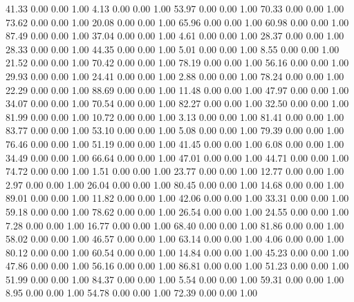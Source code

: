    41.33   0.00   0.00   1.00
    4.13   0.00   0.00   1.00
   53.97   0.00   0.00   1.00
   70.33   0.00   0.00   1.00
   73.62   0.00   0.00   1.00
   20.08   0.00   0.00   1.00
   65.96   0.00   0.00   1.00
   60.98   0.00   0.00   1.00
   87.49   0.00   0.00   1.00
   37.04   0.00   0.00   1.00
    4.61   0.00   0.00   1.00
   28.37   0.00   0.00   1.00
   28.33   0.00   0.00   1.00
   44.35   0.00   0.00   1.00
    5.01   0.00   0.00   1.00
    8.55   0.00   0.00   1.00
   21.52   0.00   0.00   1.00
   70.42   0.00   0.00   1.00
   78.19   0.00   0.00   1.00
   56.16   0.00   0.00   1.00
   29.93   0.00   0.00   1.00
   24.41   0.00   0.00   1.00
    2.88   0.00   0.00   1.00
   78.24   0.00   0.00   1.00
   22.29   0.00   0.00   1.00
   88.69   0.00   0.00   1.00
   11.48   0.00   0.00   1.00
   47.97   0.00   0.00   1.00
   34.07   0.00   0.00   1.00
   70.54   0.00   0.00   1.00
   82.27   0.00   0.00   1.00
   32.50   0.00   0.00   1.00
   81.99   0.00   0.00   1.00
   10.72   0.00   0.00   1.00
    3.13   0.00   0.00   1.00
   81.41   0.00   0.00   1.00
   83.77   0.00   0.00   1.00
   53.10   0.00   0.00   1.00
    5.08   0.00   0.00   1.00
   79.39   0.00   0.00   1.00
   76.46   0.00   0.00   1.00
   51.19   0.00   0.00   1.00
   41.45   0.00   0.00   1.00
    6.08   0.00   0.00   1.00
   34.49   0.00   0.00   1.00
   66.64   0.00   0.00   1.00
   47.01   0.00   0.00   1.00
   44.71   0.00   0.00   1.00
   74.72   0.00   0.00   1.00
    1.51   0.00   0.00   1.00
   23.77   0.00   0.00   1.00
   12.77   0.00   0.00   1.00
    2.97   0.00   0.00   1.00
   26.04   0.00   0.00   1.00
   80.45   0.00   0.00   1.00
   14.68   0.00   0.00   1.00
   89.01   0.00   0.00   1.00
   11.82   0.00   0.00   1.00
   42.06   0.00   0.00   1.00
   33.31   0.00   0.00   1.00
   59.18   0.00   0.00   1.00
   78.62   0.00   0.00   1.00
   26.54   0.00   0.00   1.00
   24.55   0.00   0.00   1.00
    7.28   0.00   0.00   1.00
   16.77   0.00   0.00   1.00
   68.40   0.00   0.00   1.00
   81.86   0.00   0.00   1.00
   58.02   0.00   0.00   1.00
   46.57   0.00   0.00   1.00
   63.14   0.00   0.00   1.00
    4.06   0.00   0.00   1.00
   80.12   0.00   0.00   1.00
   60.54   0.00   0.00   1.00
   14.84   0.00   0.00   1.00
   45.23   0.00   0.00   1.00
   47.86   0.00   0.00   1.00
   56.16   0.00   0.00   1.00
   86.81   0.00   0.00   1.00
   51.23   0.00   0.00   1.00
   51.99   0.00   0.00   1.00
   84.37   0.00   0.00   1.00
    5.54   0.00   0.00   1.00
   59.31   0.00   0.00   1.00
    8.95   0.00   0.00   1.00
   54.78   0.00   0.00   1.00
   72.39   0.00   0.00   1.00

